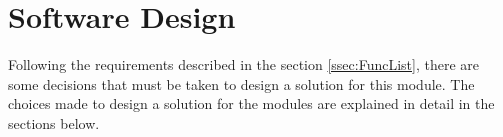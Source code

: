 \newpage
\chapter{Software Design}
    Following the requirements described in the section \ref{ssec:FuncList}, there are
    some decisions that must be taken to design a solution for this module. The choices
    made to design a solution for the modules are explained in detail in the sections below.
    
    
    
    
        




